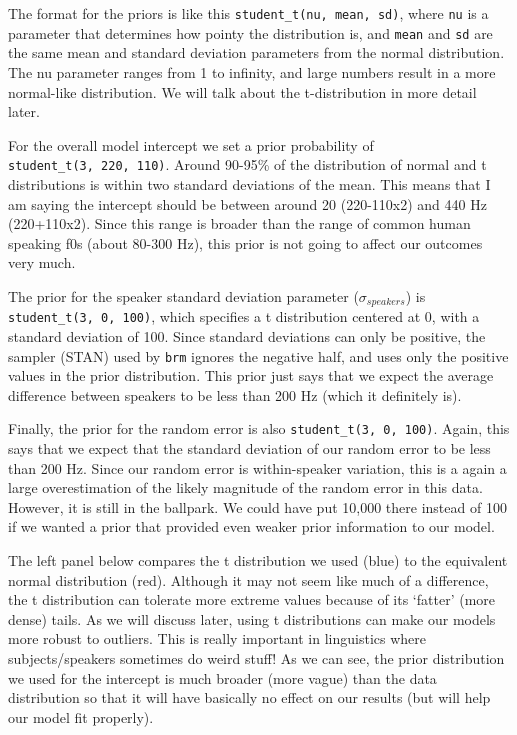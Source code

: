 \documentclass[
]{book}
\begin{document}
The format for the priors is like this \texttt{student\_t(nu,\ mean,\ sd)}, where \texttt{nu} is a parameter that determines how pointy the distribution is, and \texttt{mean} and \texttt{sd} are the same mean and standard deviation parameters from the normal distribution. The nu parameter ranges from 1 to infinity, and large numbers result in a more normal-like distribution. We will talk about the t-distribution in more detail later.

For the overall model intercept we set a prior probability of \texttt{student\_t(3,\ 220,\ 110)}. Around 90-95\% of the distribution of normal and t distributions is within two standard deviations of the mean. This means that I am saying the intercept should be between around 20 (220-110x2) and 440 Hz (220+110x2). Since this range is broader than the range of common human speaking f0s (about 80-300 Hz), this prior is not going to affect our outcomes very much.

The prior for the speaker standard deviation parameter (\(\sigma_{speakers}\)) is \texttt{student\_t(3,\ 0,\ 100)}, which specifies a t distribution centered at 0, with a standard deviation of 100. Since standard deviations can only be positive, the sampler (STAN) used by \texttt{brm} ignores the negative half, and uses only the positive values in the prior distribution. This prior just says that we expect the average difference between speakers to be less than 200 Hz (which it definitely is).

Finally, the prior for the random error is also \texttt{student\_t(3,\ 0,\ 100)}. Again, this says that we expect that the standard deviation of our random error to be less than 200 Hz. Since our random error is within-speaker variation, this is a again a large overestimation of the likely magnitude of the random error in this data. However, it is still in the ballpark. We could have put 10,000 there instead of 100 if we wanted a prior that provided even weaker prior information to our model.

The left panel below compares the t distribution we used (blue) to the equivalent normal distribution (red). Although it may not seem like much of a difference, the t distribution can tolerate more extreme values because of its `fatter' (more dense) tails. As we will discuss later, using t distributions can make our models more robust to outliers. This is really important in linguistics where subjects/speakers sometimes do weird stuff! As we can see, the prior distribution we used for the intercept is much broader (more vague) than the data distribution so that it will have basically no effect on our results (but will help our model fit properly).
\end{document}
